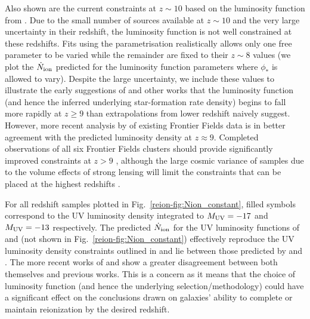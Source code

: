 Also shown are the current constraints at $z\sim10$ based on the luminosity function from \citet{Oesch:2014cs}. Due to the small number of sources available at $z\sim10$ and the very large uncertainty in their redshift, the luminosity function is not well constrained at these redshifts. Fits using the \citet{Schechter:1976gl} parametrisation realistically allows only one free parameter to be varied while the remainder are fixed to their $z\sim8$ values (we plot the $\dot{N}_{\rm{ion}}$ predicted for the luminosity function parameters where $\phi_{*}$ is allowed to vary). Despite the large uncertainty, we include these values to illustrate the early suggestions of \citet{Oesch:2014cs} and other works \citep{Zheng:2012hu,Coe:2012ko} that the luminosity function (and hence the inferred underlying star-formation rate density) begins to fall more rapidly at $z \geq 9$ than extrapolations from lower redshift naively suggest. However, more recent analysis by \citet{McLeod:2014wz} of existing Frontier Fields data is in better agreement with the predicted luminosity density at $z \approx 9$. Completed observations of all six Frontier Fields clusters should provide significantly improved constraints at $z>9$ \citep{2015ApJ...800...84C}, although the large cosmic variance of samples due to the volume effects of strong lensing will limit the constraints that can be placed at the highest redshifts \citep{2014ApJ...796L..27R}.

For all redshift samples plotted in Fig.~\ref{reion-fig:Nion_constant}, filled symbols correspond to the UV luminosity density integrated to $M_{\rm{UV}} = -17$ and $M_{\rm{UV}} = -13$ respectively. The predicted $\dot{N}_{\rm{ion}}$ for the UV luminosity functions of \citet{Schenker:2013cl} and \citet{McLure:2013hh} (not shown in Fig.~\ref{reion-fig:Nion_constant}) effectively reproduce the UV luminosity density constraints outlined in  and lie between those predicted by \citet{2015ApJ...803...34B} and \citet{Finkelstein:2014ub}. The more recent works of \citet{2015ApJ...803...34B} and \citet{Finkelstein:2014ub} show a greater disagreement between both themselves and previous works. This is a concern as it means that the choice of luminosity function (and hence the underlying selection/methodology) could have a significant effect on the conclusions drawn on galaxies' ability to complete or maintain reionization by the desired redshift.

